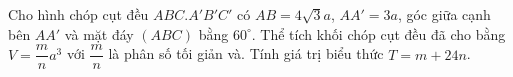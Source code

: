 \begin{ex}%
    Cho hình chóp cụt đều $ ABC.A'B'C'$ có $ AB=4\sqrt {3}a$, $ AA'=3a$, góc giữa cạnh bên $AA'$ và mặt đáy $\left(ABC\right)$ bằng $ 60^\circ $. Thể tích khối chóp cụt đều đã cho bằng $V=\dfrac{m}{n}{a^3}$ với $\dfrac{m}{n}$ là phân số tối giản và. Tính giá trị biểu thức $ T=m+24n$.

\end{ex}
